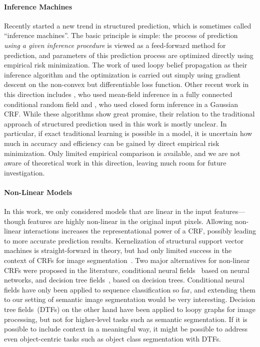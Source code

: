 \documentclass[12pt,toc=bibnumbered, a4paper,twoside,DIV=11,BCOR=1cm]{scrbook}
\begin{document}
\paragraph{Inference Machines}
Recently \citet{stoyanov2011empirical} started a new trend in structured
prediction, which is sometimes called ``inference machines''. The basic
principle is simple: the process of prediction \emph{using a given inference
procedure} is viewed as a feed-forward method for prediction, and parameters of this
prediction process are optimized directly using empirical risk minimization. The work of
\citet{stoyanov2011empirical} used loopy belief propagation as their inference
algorithm and the optimization is carried out simply using gradient descent on
the non-convex but differentiable loss function. Other recent work in this
direction includes \citet{krahenbuhlparameter}, who used mean-field inference
in a fully connected conditional random field and \citet{jancsarylearning}, who
used closed form inference in a Gaussian CRF\@.
While these algorithms show great promise, their relation to the traditional
approach of structured prediction used in this work is mostly unclear. In particular,
if exact traditional learning is possible in a model, it is uncertain how much
in accuracy and efficiency can be gained by direct empirical risk minimization.
Only limited empirical comparison is available, and we are not aware of theoretical
work in this direction, leaving much room for future investigation.
%
\paragraph{Non-Linear Models}
In this work, we only considered models that are linear in the input features---though
features are highly non-linear in the original input pixels. Allowing non-linear
interactions increases the representational power of a CRF, possibly leading
to more accurate prediction results.
Kernelization of structural support vector machines is straight-forward in theory, but
had only limited success in the context of CRFs for image
segmentation~\citep{lucchi2012structured}.
Two major alternatives for non-linear CRFs were proposed in the literature,
conditional neural fields~\citep{peng2009conditional} based on neural networks,
and decision tree fields~\citep{nowozin2011decision}, based on decision trees.
Conditional neural fields have only been applied to sequence classification so far,
and extending them to our setting of semantic image segmentation would be very
interesting. Decision tree fields~(DTFs) on the other hand have been applied to loopy
graphs for image processing, but not for higher-level tasks such as semantic
segmentation. If it is possible to include context in a meaningful way, it
might be possible to address even object-centric tasks such as object class
segmentation with DTFs.
%
\end{document}
